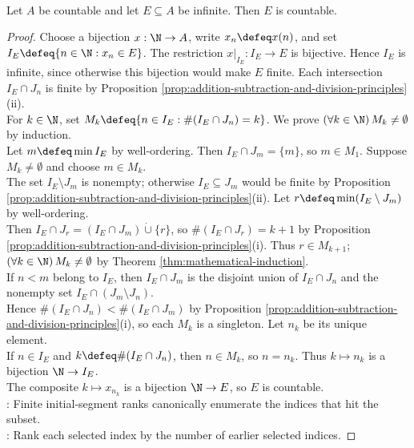 \begin{theorem} \label{thm:infinite-subset-of-countable-is-countable} \\
Let $A$ be countable and let $E\subseteq A$ be infinite. Then $E$ is countable.
\begin{proof}
Choose a bijection $x:\N\to A$, write $x_n\defeq x(n)$, and set $I_E\defeq\{n\in\N:x_n\in E\}$. The restriction $x|_{I_E}:I_E\to E$ is bijective. Hence $I_E$ is infinite, since otherwise this bijection would make $E$ finite. Each intersection $I_E\cap J_n$ is finite by Proposition \ref{prop:addition-subtraction-and-division-principles}(ii).\\
For $k\in\N$, set $M_k\defeq\{n\in I_E:\#(I_E\cap J_n)=k\}$. We prove $(\forall k\in\N)\,M_k\neq\emptyset$ by induction.\\
Let $m\defeq\min I_E$ by well-ordering. Then $I_E\cap J_m=\{m\}$, so $m\in M_1$. Suppose $M_k\neq\emptyset$ and choose $m\in M_k$.\\
The set $I_E\setminus J_m$ is nonempty; otherwise $I_E\subseteq J_m$ would be finite by Proposition \ref{prop:addition-subtraction-and-division-principles}(ii). Let $r\defeq\min(I_E\setminus J_m)$ by well-ordering.\\
Then $I_E\cap J_r=(I_E\cap J_m)\mathbin{\dot\cup}\{r\}$, so $\#(I_E\cap J_r)=k+1$ by Proposition \ref{prop:addition-subtraction-and-division-principles}(i). Thus $r\in M_{k+1}$; $(\forall k\in\N)\,M_k\neq\emptyset$ by Theorem \ref{thm:mathematical-induction}.\\
If $n<m$ belong to $I_E$, then $I_E\cap J_m$ is the disjoint union of $I_E\cap J_n$ and the nonempty set $I_E\cap(J_m\setminus J_n)$.\\
Hence $\#(I_E\cap J_n)<\#(I_E\cap J_m)$ by Proposition \ref{prop:addition-subtraction-and-division-principles}(i), so each $M_k$ is a singleton. Let $n_k$ be its unique element.\\
If $n\in I_E$ and $k\defeq\#(I_E\cap J_n)$, then $n\in M_k$, so $n=n_k$. Thus $k\mapsto n_k$ is a bijection $\N\to I_E$.\\
The composite $k\mapsto x_{n_k}$ is a bijection $\N\to E$, so $E$ is countable.\\
: Finite initial-segment ranks canonically enumerate the indices that hit the subset.\\
: Rank each selected index by the number of earlier selected indices.
\end{proof}
\end{theorem}

